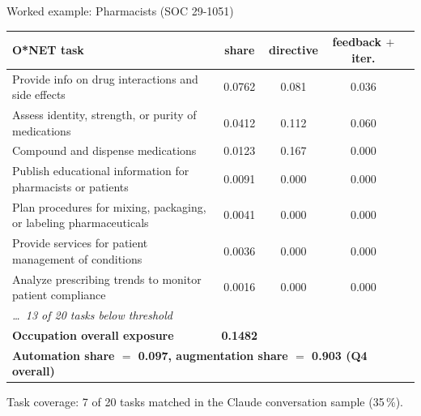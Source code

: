 \begin{frame}{Worked example: Pharmacists (SOC 29-1051)}
\centering\scriptsize
\begin{tabular}{p{7.5cm}cccc}
\toprule
O*NET task & share & directive & feedback $+$ iter. & \\
\midrule
Provide info on drug interactions and side effects               & 0.0762 & 0.081 & 0.036 & \\
Assess identity, strength, or purity of medications              & 0.0412 & 0.112 & 0.060 & \\
Compound and dispense medications                                & 0.0123 & 0.167 & 0.000 & \\
Publish educational information for pharmacists or patients     & 0.0091 & 0.000 & 0.000 & \\
Plan procedures for mixing, packaging, or labeling pharmaceuticals & 0.0041 & 0.000 & 0.000 & \\
Provide services for patient management of conditions            & 0.0036 & 0.000 & 0.000 & \\
Analyze prescribing trends to monitor patient compliance         & 0.0016 & 0.000 & 0.000 & \\
\multicolumn{2}{l}{\itshape \dots\ 13 of 20 tasks below threshold} & & & \\
\midrule
\textbf{Occupation overall exposure} & \textbf{0.1482} & & & \\
\multicolumn{4}{l}{\textbf{Automation share $=$ 0.097, augmentation share $=$ 0.903 (Q4 overall)}} & \\
\bottomrule
\end{tabular}

\vspace{0.4em}
Task coverage: 7 of 20 tasks matched in the Claude conversation sample (35\,\%).
\end{frame}


